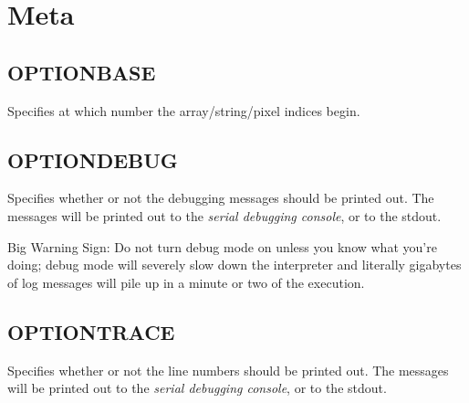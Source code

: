\section{Meta}

    \subsection{OPTIONBASE}
        \par
        Specifies at which number the array/string/pixel indices begin.
    \subsection{OPTIONDEBUG}
        \par
        Specifies whether or not the debugging messages should be printed out. The messages will be printed out to the \emph{serial debugging console}, or to the stdout.\par
        {\LARGE Big Warning Sign:} Do not turn debug mode on unless you know what you're doing; debug mode will severely slow down the interpreter and literally gigabytes of log messages will pile up in a minute or two of the execution.
    \subsection{OPTIONTRACE}
        \par
        Specifies whether or not the line numbers should be printed out. The messages will be printed out to the \emph{serial debugging console}, or to the stdout.
